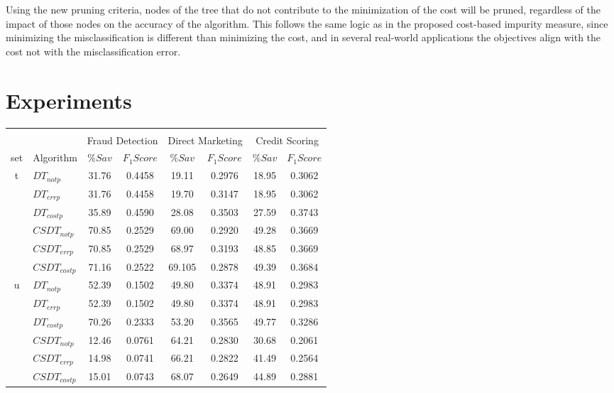 		Using the new pruning criteria, nodes of the tree that do not contribute to the minimization of 
		the cost will be pruned, regardless of the impact of those nodes on the accuracy of the
		algorithm. This follows the same logic as in the proposed cost-based impurity measure, since 
		minimizing the misclassification is different than minimizing the cost, and in several 
		real-world applications the objectives align with the cost not with the misclassification error.
		
\section{Experiments}
\label{sec:8:experiments}

\begin{table}
  \centering
  \footnotesize
  \begin{tabular}{|c|l|c c|c c |c c|}
    \multicolumn{8}{c}{ }\\
    \cline{3-8}
    \multicolumn{2}{c}{}& \multicolumn{2}{|c}{Fraud Detection} & \multicolumn{2}{|c|}{Direct 
    Marketing} &
    \multicolumn{2}{|c|}{Credit Scoring}\\
    \hline
    set&Algorithm & $\%Sav$ & $F_1Score$ & $\%Sav$ & $F_1Score$ & $\%Sav$ & $F_1Score$\\
    \hline
    t&$DT_{not p}$& 31.76&0.4458&19.11&0.2976&18.95&0.3062\\
    &$DT_{err p}$&  31.76&0.4458&19.70&0.3147&18.95&0.3062\\
    &$DT_{cost p}$& 35.89&0.4590&28.08&0.3503&27.59&0.3743\\
    &$CSDT_{not p}$&  70.85&0.2529&69.00&0.2920&49.28&0.3669\\
    &$CSDT_{err p}$&  70.85&0.2529&68.97&0.3193&48.85&0.3669\\
    &$CSDT_{cost p}$& 71.16&0.2522&69.105&0.2878&49.39&0.3684\\
    \hline
    u&$DT_{not p}$& 52.39&0.1502&49.80&0.3374&48.91&0.2983\\
    &$DT_{err p}$&  52.39&0.1502&49.80&0.3374&48.91&0.2983\\
    &$DT_{cost p}$& 70.26&0.2333&53.20&0.3565&49.77&0.3286\\
    &$CSDT_{not p}$&  12.46&0.0761&64.21&0.2830&30.68&0.2061\\
    &$CSDT_{err p}$&  14.98&0.0741&66.21&0.2822&41.49&0.2564\\
    &$CSDT_{cost p}$& 15.01&0.0743&68.07&0.2649&44.89&0.2881\\

\end{tabular}
\end{table}
